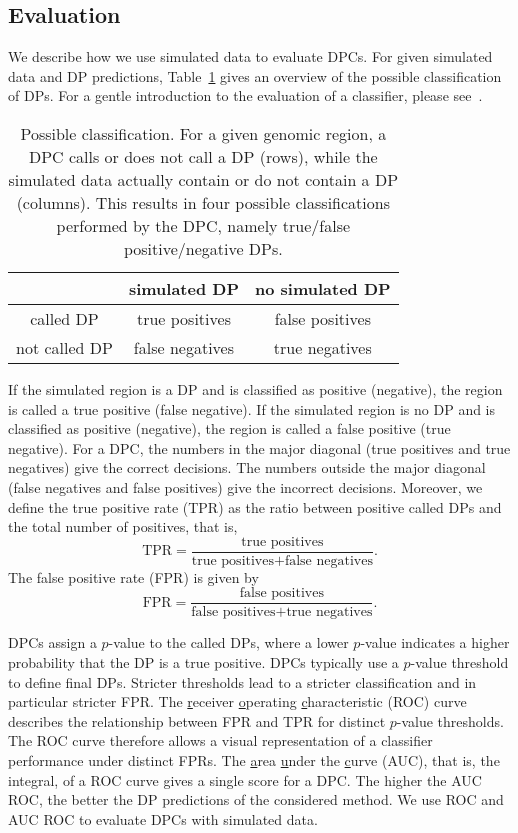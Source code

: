 \subsection{Evaluation}
\label{sec_sim_eval}
We describe how we use simulated data to evaluate DPCs.
For given simulated data and DP predictions, Table~\ref{tab_pos_outcomes} gives an overview of the possible classification of DPs.
For a gentle introduction to the evaluation of a classifier, please see~\cite{Fawcett2004}.

\begin{table}[ht]
\centering
  	\begin{tabular}{c|c c}
	  		& simulated DP			& no simulated DP\\ \hline
	  called DP	& true positives		& false positives \\
	  not called DP	& false negatives		& true negatives \\
  	\end{tabular}
\caption[Possible classification of DPs]{Possible classification.
For a given genomic region, a DPC calls or does not call a DP (rows), while the simulated data actually contain or do not contain a DP (columns).
This results in four possible classifications performed by the DPC, namely true/false positive/negative DPs.}
\label{tab_pos_outcomes}
\end{table}
\noindent
If the simulated region is a DP and is classified as positive (negative), the region is called a true positive (false negative).
If the simulated region is no DP and is classified as positive (negative), the region is called a false positive (true negative).
For a DPC, the numbers in the major diagonal (true positives and true negatives) give the correct decisions.
The numbers outside the major diagonal (false negatives and false positives) give the incorrect decisions.
Moreover, we define the true positive rate (TPR) as the ratio between positive called DPs and the total number of positives, that is,
$$\text{TPR} = \frac{\text{true positives}}{\text{true positives} + \text{false negatives}}.$$
The false positive rate (FPR) is given by
$$\text{FPR} = \frac{\text{false positives}}{\text{false positives} + \text{true negatives}}.$$

\noindent
DPCs assign a $p$-value to the called DPs, where a lower $p$-value indicates a higher probability that the DP is a true positive.
DPCs typically use a $p$-value threshold to define final DPs.
Stricter thresholds lead to a stricter classification and in particular stricter FPR.
The \underline{r}eceiver \underline{o}perating \underline{c}haracteristic (ROC) curve describes the relationship between FPR and TPR for distinct $p$-value thresholds.
The ROC curve therefore allows a visual representation of a classifier performance under distinct FPRs.
The \underline{a}rea \underline{u}nder the \underline{c}urve (AUC), that is, the integral, of a ROC curve gives a single score for a DPC.
The higher the AUC ROC, the better the DP predictions of the considered method.
We use ROC and AUC ROC to evaluate DPCs with simulated data.

